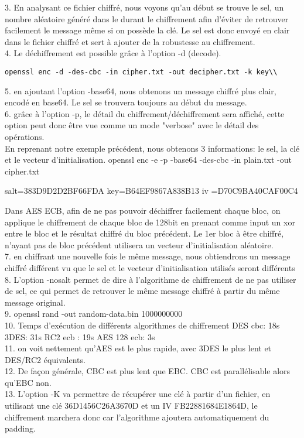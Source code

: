 \documentclass[12pt, oneside]{article}
\begin{document}
3. En analysant ce fichier chiffré, nous voyons qu'au début se trouve le sel, un nombre aléatoire généré dans le durant le chiffrement afin d'éviter de retrouver facilement le message même si on possède la clé. Le sel est donc envoyé en clair dans le fichier chiffré et sert à ajouter de la robustesse au chiffrement.\\

4. Le déchiffrement est possible grâce à l'option -d (decode).
\begin{verbatim}
openssl enc -d -des-cbc -in cipher.txt -out decipher.txt -k key\\
\end{verbatim}

5. en ajoutant l'option -base64, nous obtenons un message chiffré plus clair, encodé en base64. Le sel se trouvera toujours au début du message. \\

6. grâce à l'option -p, le détail du chiffrement/déchiffrement sera affiché, cette option peut donc être vue comme un mode "verbose" avec le détail des opérations. \\

En reprenant notre exemple précédent, nous obtenons 3 informations: le sel, la clé et le vecteur d'initialisation. 
openssl enc -e -p -base64 -des-cbc -in plain.txt -out cipher.txt

salt=383D9D2D2BF66FDA
key=B64EF9867A838B13
iv =D70C9BA40CAF00C4

Dans AES ECB, afin de ne pas pouvoir déchiffrer facilement chaque bloc, on applique le chiffrement de chaque bloc de 128bit en prenant comme input un xor entre le bloc et le résultat chiffré du bloc précédent. Le 1er bloc à être chiffré, n'ayant pas de bloc précédent utilisera un vecteur d'initialisation aléatoire. \\

7. en  chiffrant une nouvelle fois le même message, nous obtiendrons un message chiffré différent vu que le sel et le vecteur d'initialisation utilisés seront différents\\

8. L'option -nosalt permet de dire à l'algorithme de chiffrement de ne pas utiliser de sel, ce qui permet de retrouver le même message chiffré à partir du même message original. \\

9. openssl rand -out random-data.bin 1000000000\\

10. Temps d'exécution de différents algorithmes de chiffrement
DES cbc: 18s
3DES: 31s
RC2 ecb : 19s
AES 128 ecb: 3s\\

11. on voit nettement qu'AES est le plus rapide, avec 3DES le plus lent et DES/RC2 équivalents. \\

12. De façon générale, CBC est plus lent que EBC. CBC est parallélisable alors qu'EBC non. \\

13. L'option -K va permettre de récupérer une clé à partir d'un fichier, en utilisant une clé 36D1456C26A3670D et un IV FB22881684E1864D, le chiffrement marchera donc car l'algorithme ajoutera automatiquement du padding. 
\end{document}
